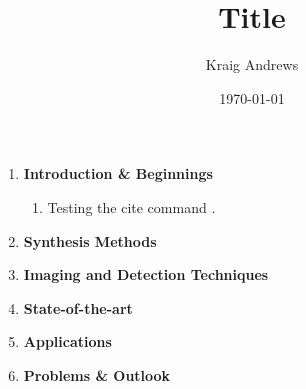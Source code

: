 \documentclass{article}
\author{Kraig Andrews}
\title{Title}
\date{\today}
\begin{document}
\maketitle

\begin{enumerate}%

	\item{\textbf{Introduction \& Beginnings}}
	\begin{enumerate}
		\item{ Testing the cite command \cite{Li2012}.}
	\end{enumerate}

	\item{\textbf{Synthesis Methods}}

	\item{\textbf{Imaging and Detection Techniques}}

	\item{\textbf{State-of-the-art}}

	\item{\textbf{Applications}}

	\item{\textbf{Problems \& Outlook}}

\end{enumerate} %



\end{document}
